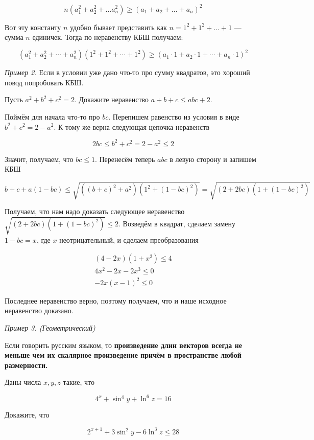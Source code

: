 $$
    n(a_1^2 + a_2^2 + \ldots a_n^2) \geqslant (a_1 + a_2 + \ldots + a_n)^2
$$

Вот эту константу $n$ удобно бывает представить как $n = 1^2 + 1^2 + \ldots + 1$ --- сумма $n$ единичек. Тогда по неравенству КБШ получаем:

$$
    \left(a_1^2+a_2^2+\cdots+a_n^2\right)\left(1^2+1^2+\cdots+1^2\right) \geqslant\left(a_1 \cdot 1+a_2 \cdot 1+\cdots+a_n \cdot 1\right)^2
$$

\textit{Пример 2.}
Если в условии уже дано что-то про сумму квадратов, это хороший повод попробовать КБШ.

Пусть $a^2+b^2+c^2=2$. Докажите неравенство $a+b+c \leqslant a b c+2$.

Поймём для начала что-то про $b c$. Перепишем равенство из условия в виде $b^2+c^2=2-a^2$. К тому же верна следующая цепочка неравенств

$$
2 b c \leqslant b^2+c^2=2-a^2 \leqslant 2
$$


Значит, получаем, что $b c \leqslant 1$. Перенесём теперь $a b c$ в левую сторону и запишем КБШ

$$
b+c+a(1-b c) \leqslant \sqrt{\left((b+c)^2+a^2\right)\left(1^2+(1-b c)^2\right)}=\sqrt{(2+2 b c)\left(1+(1-b c)^2\right)}
$$


Получаем, что нам надо доказать следующее неравенство $\sqrt{(2+2 b c)\left(1+(1-b c)^2\right)} \leqslant 2$. Возведём в квадрат, сделаем замену $1-b c=x$, где $x$ неотрицательный, и сделаем преобразования

$$
\begin{gathered}
(4-2 x)\left(1+x^2\right) \leqslant 4 \\
4 x^2-2 x-2 x^3 \leqslant 0 \\
-2 x(x-1)^2 \leqslant 0
\end{gathered}
$$


Последнее неравенство верно, поэтому получаем, что и наше исходное неравенство доказано.

\textit{Пример 3. (Геометрический)}

Если говорить русским языком, то \textbf{произведение длин векторов всегда не меньше чем их скалярное произведение причём в пространстве любой размерности.}

Даны числа $x, y, z$ такие, что

$$
4^x+\sin ^4 y+\ln ^6 z=16
$$


Докажите, что

$$
2^{x+1}+3 \sin ^2 y-6 \ln ^3 z \leqslant 28
$$


